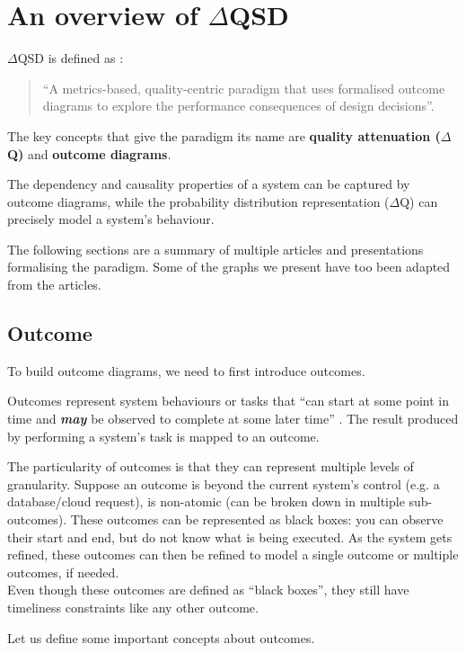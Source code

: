 \section{An overview of $\Delta$QSD}
    $\Delta$QSD is defined as \cite{myo}:
    \begin{quote}
        ``A metrics-based, quality-centric paradigm that uses formalised outcome diagrams to explore the performance consequences of design decisions''.
    \end{quote}
    
    The key concepts that give the paradigm its name are \textbf{quality attenuation ($\Delta$Q)} and \textbf{outcome diagrams}. \cite{dq-tut}

    The dependency and causality properties of a system can be captured by outcome diagrams, while the probability distribution representation ($\Delta$Q) can precisely model a system's behaviour. \cite{myo}
 
    The following sections are a summary of multiple articles and presentations formalising the paradigm. Some of the graphs we present have too been adapted from the articles.
     
 \subsection{Outcome}
    To build outcome diagrams, we need to first introduce outcomes.

        Outcomes represent system behaviours or tasks that ``can start at some point in time and \textit{\textbf{may}} be observed to complete at some later time'' \cite{dq-br}.
        The result produced by performing a system's task is mapped to an outcome. \cite{myo} 
     
        The particularity of outcomes is that they can represent multiple levels of granularity. Suppose an outcome is beyond the current system's control (e.g. a database/cloud request), is non-atomic (can be broken down in multiple sub-outcomes). These outcomes can be represented as black boxes: you can observe their start and end, but do not know what is being executed. As the system gets refined, these outcomes can then be refined to model a single outcome or multiple outcomes, if needed. \cite{myo} \\ 
        Even though these outcomes are defined as ``black boxes'', they still have timeliness constraints like any other outcome. 

        Let us define some important concepts about outcomes.

